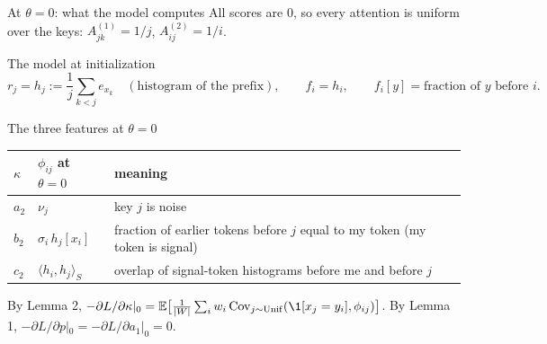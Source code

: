 \begin{frame}{At $\theta=0$: what the model computes}
\small
All scores are $0$, so every attention is uniform over the keys: $A^{(1)}_{jk}=1/j$, $A^{(2)}_{ij}=1/i$.
\begin{block}{The model at initialization}
\vspace{-0.5em}
\[
r_j=h_j:=\frac1j\sum_{k<j}e_{x_k}\quad(\text{histogram of the prefix}),\qquad f_i=h_i,\qquad f_i[y]=\text{fraction of $y$ before $i$.}
\]
\end{block}
\begin{block}{The three features at $\theta=0$}
\begin{center}
\begin{tabular}{lll}\toprule
$\kappa$ & $\phi_{ij}$ at $\theta=0$ & meaning\\\midrule
$a_2$ & $\nu_j$ & key $j$ is noise\\
$b_2$ & $\sigma_i\,h_j[x_i]$ & fraction of earlier tokens before $j$ equal to my token (my token is signal)\\
$c_2$ & $\langle h_i,h_j\rangle_S$ & overlap of signal-token histograms before me and before $j$\\\bottomrule
\end{tabular}
\end{center}
\end{block}
By Lemma 2, $-\partial L/\partial\kappa|_0=\mathbb E\big[\frac1{|W|}\sum_iw_i\,\mathrm{Cov}_{j\sim\mathrm{Unif}}(\1[x_j=y_i],\phi_{ij})\big]$.
By Lemma 1, $-\partial L/\partial p|_0=-\partial L/\partial a_1|_0=0$.
\end{frame}

